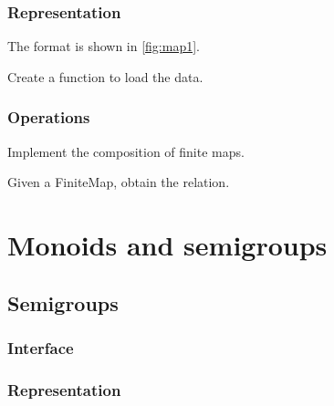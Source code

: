 \begin{exercise}

\subsection*{Representation}

The format is shown in \cref{fig:map1}.


\begin{exercise}[Representation]
Create a function to load the data.


%

\end{exercise}

\subsection{Operations}


\begin{exercise}[Composition]
Implement the composition of finite maps.


%

\end{exercise}


\begin{exercise}
Given a FiniteMap, obtain the relation.


%

\end{exercise}


\chapter{Monoids and semigroups}


\section{Semigroups}

\subsection*{Interface}



\subsection*{Representation}


\end{exercise}
